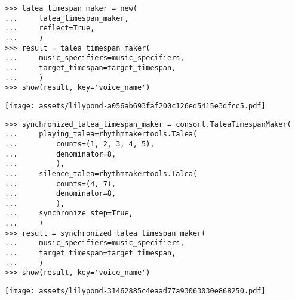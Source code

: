 \begin{comment}
<abjad>
talea_timespan_maker = new(
    talea_timespan_maker,
    reflect=True,
    )
result = talea_timespan_maker(
    music_specifiers=music_specifiers,
    target_timespan=target_timespan,
    )
show(result, key='voice_name')
</abjad>
\end{comment}

\begin{singlespacing}
\vspace{-0.5\baselineskip}
\begin{lstlisting}
>>> talea_timespan_maker = new(
...     talea_timespan_maker,
...     reflect=True,
...     )
>>> result = talea_timespan_maker(
...     music_specifiers=music_specifiers,
...     target_timespan=target_timespan,
...     )
>>> show(result, key='voice_name')
\end{lstlisting}
\noindent\texttt{[image: assets/lilypond-a056ab693faf200c126ed5415e3dfcc5.pdf]}
\end{singlespacing}

\begin{comment}
<abjad>
synchronized_talea_timespan_maker = consort.TaleaTimespanMaker(
    playing_talea=rhythmmakertools.Talea(
        counts=(1, 2, 3, 4, 5),
        denominator=8,
        ),
    silence_talea=rhythmmakertools.Talea(
        counts=(4, 7),
        denominator=8,
        ),
    synchronize_step=True,
    )
result = synchronized_talea_timespan_maker(
    music_specifiers=music_specifiers,
    target_timespan=target_timespan,
    )
show(result, key='voice_name')
</abjad>
\end{comment}

\begin{singlespacing}
\vspace{-0.5\baselineskip}
\begin{lstlisting}
>>> synchronized_talea_timespan_maker = consort.TaleaTimespanMaker(
...     playing_talea=rhythmmakertools.Talea(
...         counts=(1, 2, 3, 4, 5),
...         denominator=8,
...         ),
...     silence_talea=rhythmmakertools.Talea(
...         counts=(4, 7),
...         denominator=8,
...         ),
...     synchronize_step=True,
...     )
>>> result = synchronized_talea_timespan_maker(
...     music_specifiers=music_specifiers,
...     target_timespan=target_timespan,
...     )
>>> show(result, key='voice_name')
\end{lstlisting}
\noindent\texttt{[image: assets/lilypond-31462885c4eaad77a93063030e868250.pdf]}
\end{singlespacing}

